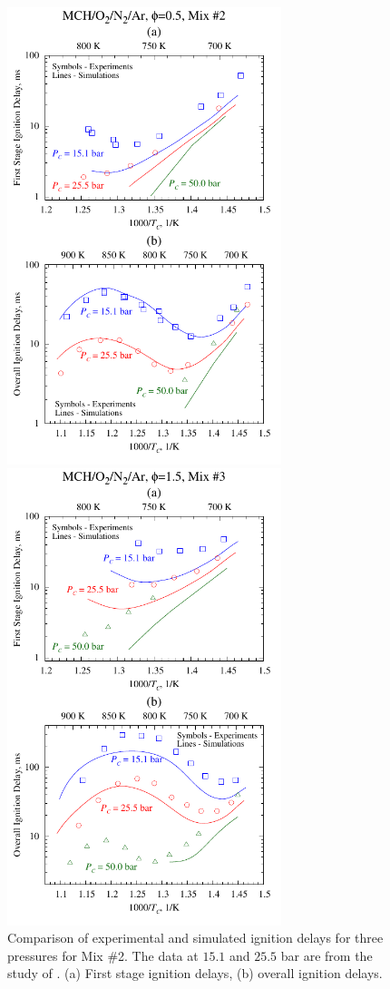\documentclass[12pt, letterpaper]{article}
\begin{document}
\begin{figure}
    \centering
    \begin{minipage}{0.45\textwidth}
        \includegraphics[width=8cm]{../figures/05-MCH/mch-model-2}
        \caption{Comparison of experimental and simulated ignition delays for three
            pressures for Mix \#2. The data at $15.1$ and $25.5$ bar are from the
            study of \textcite{Mittal2009}. (a) First stage ignition delays,
            (b) overall ignition delays.}
        \label{fig:mch-model-2}
    \end{minipage}
    \quad
    \begin{minipage}{0.45\textwidth}
        \includegraphics[width=8cm]{../figures/05-MCH/mch-model-3}

\end{minipage}
\end{figure}
\end{document}
